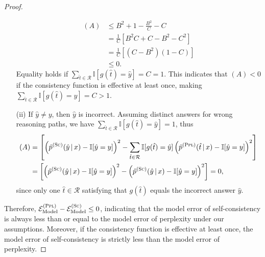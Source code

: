 \begin{proof}
\begin{enumerate}
        \begin{equation}
            \begin{aligned}
                (A) &\leq B^2 + 1 - \frac{B^2}{C} - C \\
                &=\frac{1}{C}\left [  B^2C + C - B^2 - C^2 \right ] \\
                &=\frac{1}{C}\left [  (C-B^2)(1-C) \right ] \\
                &\leq 0.
            \end{aligned}
        \end{equation}
        Equality holds if $\sum_{\hat{t} \in \mathcal{R}} \mathbb{I}[g(\hat{t}) = \hat{y}]= C = 1$. This indicates that $(A)<0$ if the consistency function is effective at least once, making $\sum_{\hat{t} \in \mathcal{R}} \mathbb{I}[g(\hat{t}) = \hat{y}]= C >1$.
        \item[(ii)] If $\hat{y} \neq y$, then $\hat{y}$ is incorrect. Assuming distinct answers for wrong reasoning paths, we have $\sum_{\hat{t} \in \mathcal{R}} \mathbb{I}[g(\hat{t}) = \hat{y}] = 1$, thus
        \begin{eqnarray}
            \begin{aligned}
                (A) &= \left [ \left ( \hat{p}^{(\textsc{Sc})}(\hat{y} \,|\, x) - \mathbb{I}[\hat{y} = y] \right )^2 
                - \sum_{\hat{t} \in \mathcal{R}} \mathbb{I}[g(\hat{t}) = \hat{y}] \left ( \hat{p}^{(\textsc{Ppl})}(\hat{t} \,|\, x) - \mathbb{I}[\hat{y} = y] \right )^2 \right ] \\
                &= \left [ \left ( \hat{p}^{(\textsc{Sc})}(\hat{y} \,|\, x) 
                - \mathbb{I}[\hat{y} = y] \right )^2 - \left ( \hat{p}^{(\textsc{Sc})}(\hat{y} \,|\, x) - \mathbb{I}[\hat{y} = y] \right )^2 \right ] = 0,
            \end{aligned}
        \end{eqnarray}
        since only one $\hat{t}\in \mathcal{R}$ satisfying that $g(\hat{t})$ equals the incorrect answer $\hat{y}$.
    \end{enumerate}
    Therefore, $\mathcal{E}_{\text{Model}}^{(\textsc{Ppl})} - \mathcal{E}_{\text{Model}}^{(\textsc{Sc})} \leq 0$, indicating that the model error of self-consistency is always less than or equal to the model error of perplexity under our assumptions. Moreover, if the consistency function is effective at least once, the model error of self-consistency is strictly less than the model error of perplexity.
\end{proof}


